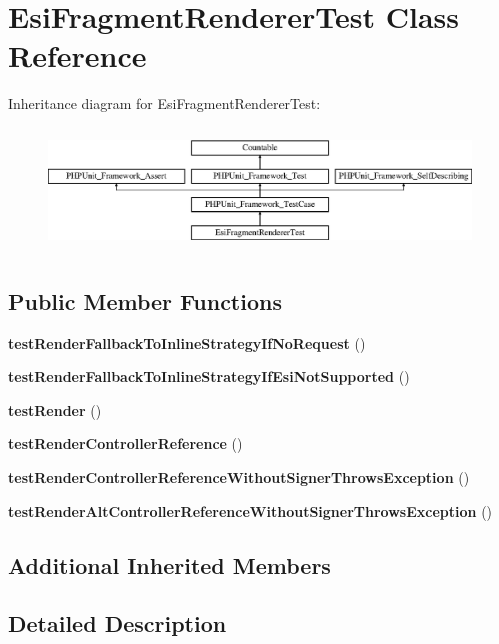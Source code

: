 \section{Esi\+Fragment\+Renderer\+Test Class Reference}
\label{class_symfony_1_1_component_1_1_http_kernel_1_1_tests_1_1_fragment_1_1_esi_fragment_renderer_test}
Inheritance diagram for Esi\+Fragment\+Renderer\+Test\+:\begin{figure}[H]
\begin{center}
\leavevmode
\includegraphics[height=3.303835cm]{class_symfony_1_1_component_1_1_http_kernel_1_1_tests_1_1_fragment_1_1_esi_fragment_renderer_test}
\end{center}
\end{figure}
\subsection*{Public Member Functions}
\begin{DoxyCompactItemize}
\item 
{\bf test\+Render\+Fallback\+To\+Inline\+Strategy\+If\+No\+Request} ()
\item 
{\bf test\+Render\+Fallback\+To\+Inline\+Strategy\+If\+Esi\+Not\+Supported} ()
\item 
{\bf test\+Render} ()
\item 
{\bf test\+Render\+Controller\+Reference} ()
\item 
{\bf test\+Render\+Controller\+Reference\+Without\+Signer\+Throws\+Exception} ()
\item 
{\bf test\+Render\+Alt\+Controller\+Reference\+Without\+Signer\+Throws\+Exception} ()
\end{DoxyCompactItemize}
\subsection*{Additional Inherited Members}


\subsection{Detailed Description}


